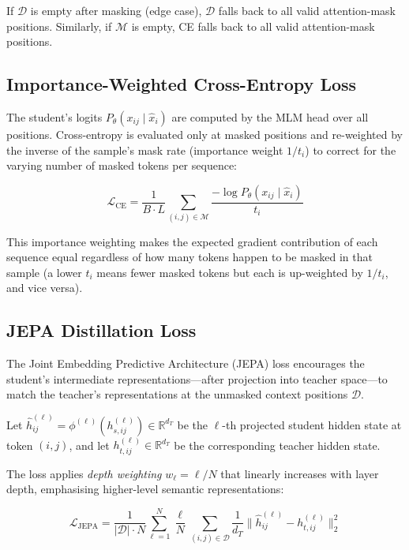 \documentclass[11pt,a4paper]{article}
\begin{document}
If $\mathcal{D}$ is empty after masking (edge case), $\mathcal{D}$ falls back to all valid
attention-mask positions.  Similarly, if $\mathcal{M}$ is empty, CE falls back to all valid
attention-mask positions.

\subsection{Importance-Weighted Cross-Entropy Loss}
\label{sec:ce_loss}

The student's logits $P_\theta(x_{ij} \mid \hat{x}_i)$ are computed by the MLM head over all
positions.  Cross-entropy is evaluated only at masked positions and re-weighted by the inverse of
the sample's mask rate (importance weight $1/t_i$) to correct for the varying number of masked
tokens per sequence:

\begin{equation}
  \boxed{
    \mathcal{L}_{\mathrm{CE}} = \frac{1}{B \cdot L}
    \sum_{(i,j)\in\mathcal{M}}
    \frac{-\log P_\theta(x_{ij} \mid \hat{x}_i)}{t_i}
  }
\end{equation}

This importance weighting makes the expected gradient contribution of each sequence equal regardless
of how many tokens happen to be masked in that sample (a lower $t_i$ means fewer masked tokens but
each is up-weighted by $1/t_i$, and vice versa).

\subsection{JEPA Distillation Loss}
\label{sec:jepa_loss}

The Joint Embedding Predictive Architecture (JEPA) loss encourages the student's intermediate
representations—after projection into teacher space—to match the teacher's representations at
the unmasked context positions $\mathcal{D}$.

Let $\hat{h}_{ij}^{(\ell)} = \phi^{(\ell)}(h_{s,ij}^{(\ell)}) \in \mathbb{R}^{d_T}$ be the
$\ell$-th projected student hidden state at token $(i,j)$, and let
$h_{t,ij}^{(\ell)} \in \mathbb{R}^{d_T}$ be the corresponding teacher hidden state.

The loss applies \emph{depth weighting} $w_\ell = \ell / N$ that linearly increases with layer
depth, emphasising higher-level semantic representations:

\begin{equation}
  \boxed{
    \mathcal{L}_{\mathrm{JEPA}} =
    \frac{1}{|\mathcal{D}| \cdot N}
    \sum_{\ell=1}^{N} \frac{\ell}{N}
    \sum_{(i,j)\in\mathcal{D}}
    \frac{1}{d_T}\bigl\|\hat{h}_{ij}^{(\ell)} - h_{t,ij}^{(\ell)}\bigr\|_2^2
  }
\end{equation}
\end{document}
